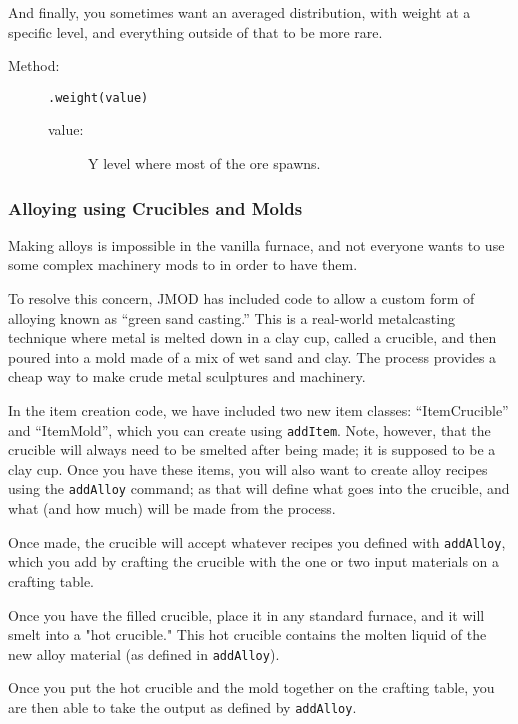 \documentclass[letterpaper,titlepage,12pt]{article}
\begin{document}
\begin{description}
And finally, you sometimes want an averaged distribution, with weight at a specific level, and everything outside of that to be more rare.

\begin{description}
\item[Method:] \texttt{.weight(value)}
\begin{description}
\item [value:] Y level where most of the ore spawns.
\end{description}
\end{description}

\subsubsection{Alloying using Crucibles and Molds}

Making alloys is impossible in the vanilla furnace, and not everyone wants to use some complex machinery mods to in order to have them.

To resolve this concern, JMOD has included code to allow a custom form of alloying known as ``green sand casting.''  This is a real-world metalcasting technique where metal is melted down in a clay cup, called a crucible, and then poured into a mold made of a mix of wet sand and clay.  The process provides a cheap way to make crude metal sculptures and machinery.

In the item creation code, we have included two new item classes: ``ItemCrucible'' and ``ItemMold'', which you can create using \texttt{addItem}.  Note, however, that the crucible will always need to be smelted after being made; it is supposed to be a clay cup.  Once you have these items, you will also want to create alloy recipes using the \texttt{addAlloy} command; as that will define what goes into the crucible, and what (and how much) will be made from the process.

Once made, the crucible will accept whatever recipes you defined with \texttt{addAlloy}, which you add by crafting the crucible with the one or two input materials on a crafting table.

Once you have the filled crucible, place it in any standard furnace, and it will smelt into a "hot crucible."  This hot crucible contains the molten liquid of the new alloy material (as defined in \texttt{addAlloy}).

Once you put the hot crucible and the mold together on the crafting table, you are then able to take the output as defined by \texttt{addAlloy}.


\end{description}
\end{document}
